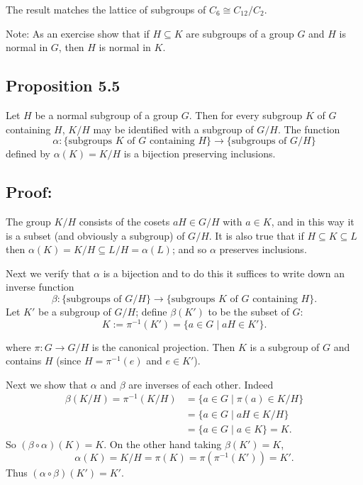 The result matches the lattice of subgroups of $C_6 \cong C_{12}/C_2$.

\noindent \color{blue} Note: As an exercise show that if $H \subseteq K$ are subgroups of a group $G$ and $H$ is normal in $G$, then $H$ is normal in $K$. \color{black}

\vspace{2em}

\subsection*{Proposition 5.5}
Let $H$ be a normal subgroup of a group $G$. Then for every subgroup $K$ of $G$ containing $H$, $K/H$ may be identified with a subgroup of $G/H$. The function
$$\alpha : \{\text{subgroups } K \text{ of } G \text{ containing } H\} \longrightarrow \{\text{subgroups of } G/H\}$$
defined by $\alpha(K) = K/H$ is a bijection preserving inclusions.

\subsection*{Proof:}
The group $K/H$ consists of the cosets $aH \in G/H$ with $a \in K$, and in this way it is a subset (and obviously a subgroup) of $G/H$. It is also true that if $H \subseteq K \subseteq L$ then $\alpha(K) = K/H \subseteq L/H = \alpha(L)$; and so $\alpha$ preserves inclusions.

Next we verify that $\alpha$ is a bijection and to do this it suffices to write down an inverse function
$$\beta : \{\text{subgroups of } G/H\} \longrightarrow \{\text{subgroups } K \text{ of } G \text{ containing } H\}.$$
Let $K'$ be a subgroup of $G/H$; define $\beta(K')$ to be the subset of $G$:
$$K := \pi^{-1}(K') = \{ a \in G \mid aH \in K' \}.$$

where $\pi : G \longrightarrow G/H$ is the canonical projection. Then $K$ is a subgroup of $G$ and contains $H$ (since $H = \pi^{-1}(e)$ and $e \in K'$).

Next we show that $\alpha$ and $\beta$ are inverses of each other. Indeed
\begin{align*}
\beta(K/H) = \pi^{-1}(K/H) &= \{a \in G \mid \pi(a) \in K/H\} \\
&= \{a \in G \mid aH \in K/H\} \\
&= \{a \in G \mid a \in K\} = K.
\end{align*}
So $(\beta \circ \alpha)(K) = K$. On the other hand taking $\beta(K') = K$,
$$\alpha(K) = K/H = \pi(K) = \pi(\pi^{-1}(K')) = K'.$$
Thus $(\alpha \circ \beta)(K') = K'$.

